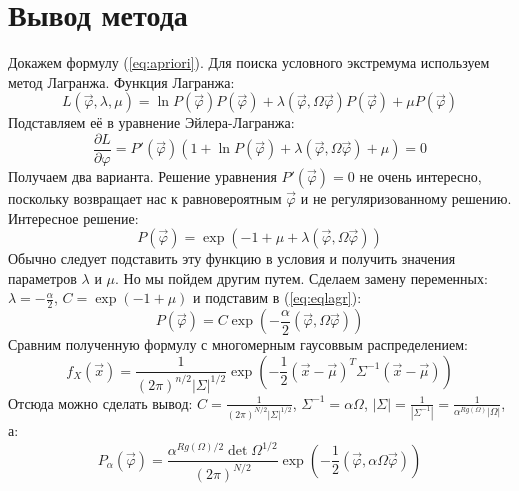 \chapter{Вывод метода}
\label{sec:metod}

Докажем формулу (\ref{eq:apriori}). Для поиска условного экстремума используем метод Лагранжа. Функция Лагранжа:
\begin{equation}
L(\vec{\varphi}, \lambda, \mu) = \ln{P(\vec{\varphi})} P(\vec{\varphi}) + \lambda (\vec{\varphi},\Omega\vec{\varphi}) P(\vec{\varphi}) + \mu P(\vec{\varphi})
\end{equation}
Подставляем её в уравнение Эйлера-Лагранжа:
\begin{equation}
\frac{\partial L}{\partial \varphi} = P'(\vec{\varphi})(1 + \ln{P(\vec{\varphi})}  + \lambda (\vec{\varphi},\Omega\vec{\varphi}) + \mu ) = 0
\end{equation}
Получаем два варианта. Решение уравнения $P'(\vec{\varphi}) = 0$ не очень интересно, поскольку возвращает нас к равновероятным $\vec{\varphi}$ и не регуляризованному решению.
Интересное решение:
\begin{equation}
P(\vec{\varphi}) = \exp(-1 + \mu + \lambda (\vec{\varphi},\Omega\vec{\varphi}))
\label{eq:eqlagr}
\end{equation}
Обычно следует подставить эту функцию в условия и получить значения параметров $\lambda$ и $\mu$. Но мы пойдем другим путем. Сделаем замену переменных: $\lambda = -\frac{\alpha}{2}$, $ C=\exp(-1 + \mu)$ и подставим в (\ref{eq:eqlagr}):
\begin{equation}
P(\vec{\varphi}) = C\exp(-\frac{\alpha}{2} (\vec{\varphi},\Omega\vec{\varphi}))
\end{equation}
Сравним полученную формулу с многомерным гаусоввым распределением:
\begin{equation}
f_X(\vec{x}) = \frac{1}{(2\pi)^{n/2}|\Sigma|^{1/2}} \exp(-\frac{1}{2}(\vec{x} - \vec{\mu})^T\Sigma^{-1}(\vec{x} - \vec{\mu}))
\end{equation}
Отсюда можно сделать вывод: $C =  \frac{1}{(2\pi)^{N/2}|\Sigma|^{1/2}}$, $\Sigma^{-1} = \alpha\Omega$, $|\Sigma| = \frac{1}{|\Sigma^{-1}|} = \frac{1}{\alpha^{Rg(\Omega)}|\Omega|}$, а:
\begin{equation}
P_{\alpha}(\vec{\varphi})  = \frac{\alpha^{Rg(\Omega)/2}\det\Omega^{1/2}}{(2\pi)^{N/2}} \exp(-\frac{1}{2} (\vec{\varphi},\alpha\Omega\vec{\varphi}))
\end{equation}
